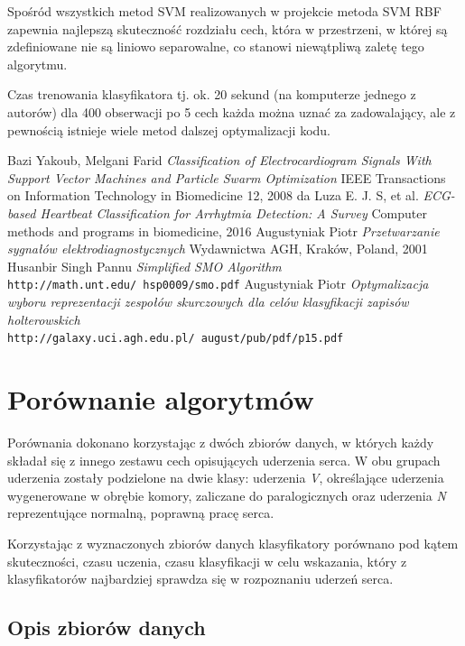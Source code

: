 \documentclass[[10pt,a4paper]{article}
\begin{document}
Spośród wszystkich metod SVM realizowanych w projekcie metoda SVM RBF zapewnia najlepszą skuteczność rozdziału cech, która w przestrzeni, w której są zdefiniowane nie są liniowo separowalne, co stanowi niewątpliwą zaletę tego algorytmu. \cite{melgani}

Czas trenowania klasyfikatora tj. ok. 20 sekund (na komputerze jednego z autorów) dla 400 obserwacji po 5 cech każda można uznać za zadowalający, ale z pewnością istnieje wiele metod dalszej optymalizacji kodu.

\begin{thebibliography}{9}
	
	Bazi Yakoub, Melgani Farid
	\textit{Classification of Electrocardiogram Signals With Support Vector Machines and Particle Swarm Optimization} 
	IEEE Transactions on Information Technology in Biomedicine 12, 2008
	da Luza E. J. S, et al.
	\textit{ECG-based Heartbeat Classification for Arrhytmia Detection: A Survey} 
	Computer methods and programs in biomedicine, 2016
	Augustyniak Piotr
	\textit{Przetwarzanie sygnałów elektrodiagnostycznych} 
	Wydawnictwa AGH, Kraków, Poland, 2001
	Husanbir Singh Pannu
	\textit{Simplified SMO Algorithm} 
	\\\texttt{http://math.unt.edu/~hsp0009/smo.pdf}
	Augustyniak Piotr
	\textit{Optymalizacja wyboru reprezentacji zespołów skurczowych dla celów klasyfikacji zapisów holterowskich} 
	\\\texttt{http://galaxy.uci.agh.edu.pl/~august/pub/pdf/p15.pdf}
	
\end{thebibliography}
\newpage
\section{Porównanie algorytmów}
Porównania dokonano korzystając z dwóch zbiorów danych, w których każdy składał się z innego zestawu cech opisujących uderzenia serca. W obu grupach uderzenia zostały podzielone na dwie klasy: uderzenia \textit{V}, określające uderzenia wygenerowane w obrębie komory, zaliczane do paralogicznych oraz uderzenia \textit{N} reprezentujące normalną, poprawną pracę serca. 

Korzystając z wyznaczonych zbiorów danych klasyfikatory porównano pod kątem skuteczności, czasu uczenia, czasu klasyfikacji w celu wskazania, który z klasyfikatorów najbardziej sprawdza się w rozpoznaniu uderzeń serca. 

\subsection{Opis zbiorów danych}
\end{document}

